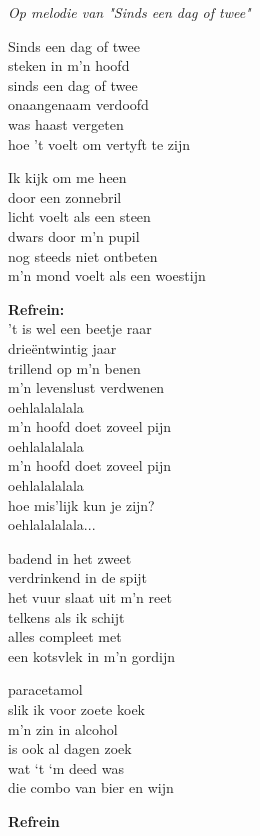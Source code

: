 \textit{Op melodie van "Sinds een dag of twee"}

Sinds een dag of twee\\
steken in m'n hoofd\\
sinds een dag of twee\\
onaangenaam verdoofd\\
was haast vergeten\\
hoe 't voelt om vertyft te zijn

Ik kijk om me heen\\
door een zonnebril\\
licht voelt als een steen\\
dwars door m'n pupil\\
nog steeds niet ontbeten\\
m'n mond voelt als een woestijn

\textbf{Refrein:}\\
't is wel een beetje raar\\
drieëntwintig jaar\\
trillend op m'n benen\\
m'n levenslust verdwenen\\
oehlalalalala\\
m'n hoofd doet zoveel pijn\\
oehlalalalala\\
m'n hoofd doet zoveel pijn\\
oehlalalalala\\
hoe mis’lijk kun je zijn?\\
oehlalalalala...

badend in het zweet\\
verdrinkend in de spijt\\
het vuur slaat uit m’n reet\\
telkens als ik schijt\\
alles compleet met\\
een kotsvlek in m’n gordijn

paracetamol \\
slik ik voor zoete koek\\
m'n zin in alcohol\\
is ook al dagen zoek\\
wat ‘t ‘m deed was\\
die combo van bier en wijn

\textbf{Refrein}